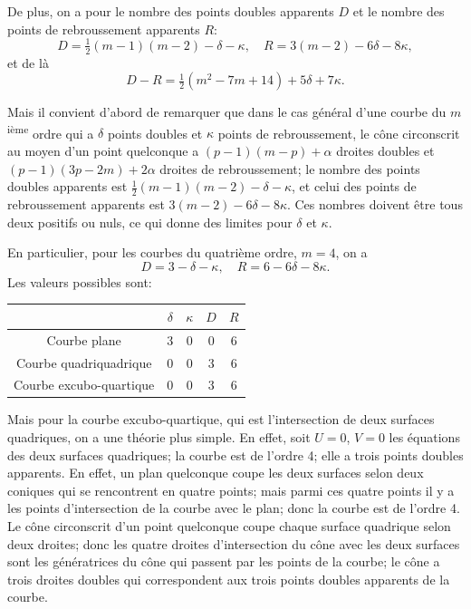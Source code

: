 \documentclass[11pt,a4paper]{article}
\begin{document}
De plus, on a pour le nombre des points doubles apparents $D$ et le nombre des points de rebroussement apparents $R$:
\[
D = \tfrac{1}{2}(m-1)(m-2) - \delta - \kappa, \quad R = 3(m-2) - 6\delta - 8\kappa,
\]
et de l\`{a}
\[
D - R = \tfrac{1}{2}(m^2 - 7m + 14) + 5\delta + 7\kappa.
\]

Mais il convient d'abord de remarquer que dans le cas g\'{e}n\'{e}ral d'une courbe du $m$\textsuperscript{i\`{e}me} ordre qui a $\delta$ points doubles et $\kappa$ points de rebroussement, le c\^{o}ne circonscrit au moyen d'un point quelconque a $(p-1)(m-p) + \alpha$ droites doubles et $(p-1)(3p-2m) + 2\alpha$ droites de rebroussement; le nombre des points doubles apparents est $\frac{1}{2}(m-1)(m-2) - \delta - \kappa$, et celui des points de rebroussement apparents est $3(m-2) - 6\delta - 8\kappa$. Ces nombres doivent \^{e}tre tous deux positifs ou nuls, ce qui donne des limites pour $\delta$ et $\kappa$.

\clearpage

En particulier, pour les courbes du quatri\`{e}me ordre, $m = 4$, on a
\[
D = 3 - \delta - \kappa, \quad R = 6 - 6\delta - 8\kappa.
\]
Les valeurs possibles sont:
\begin{center}
\begin{tabular}{c|c|c|c|c}
\hline
 & $\delta$ & $\kappa$ & $D$ & $R$ \\
\hline
Courbe plane & 3 & 0 & 0 & 6 \\
Courbe quadriquadrique & 0 & 0 & 3 & 6 \\
Courbe excubo-quartique & 0 & 0 & 3 & 6 \\
\hline
\end{tabular}
\end{center}

Mais pour la courbe excubo-quartique, qui est l'intersection de deux surfaces quadriques, on a une th\'{e}orie plus simple. En effet, soit $U = 0$, $V = 0$ les \'{e}quations des deux surfaces quadriques; la courbe est de l'ordre 4; elle a trois points doubles apparents. En effet, un plan quelconque coupe les deux surfaces selon deux coniques qui se rencontrent en quatre points; mais parmi ces quatre points il y a les points d'intersection de la courbe avec le plan; donc la courbe est de l'ordre 4. Le c\^{o}ne circonscrit d'un point quelconque coupe chaque surface quadrique selon deux droites; donc les quatre droites d'intersection du c\^{o}ne avec les deux surfaces sont les g\'{e}n\'{e}ratrices du c\^{o}ne qui passent par les points de la courbe; le c\^{o}ne a trois droites doubles qui correspondent aux trois points doubles apparents de la courbe.
\end{document}
